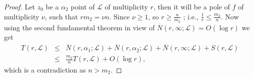 \documentclass[a4paper,draft]{amsproc}
\theoremstyle{plain}
\theoremstyle{definition}
\theoremstyle{remark}
\newcommand{\ol}{\overline}
\newcommand{\beas}{\begin{eqnarray*}}
\newcommand{\eeas}{\end{eqnarray*}}
\numberwithin{equation}{section}
\renewcommand{\leq}{\leqslant}\renewcommand{\geq}{\geqslant}
\begin{document}
\begin{proof}
Let $z_0$ be a $\alpha_2$ point of $\mathcal{L}$ of multiplicity $r$, then it will be a pole of $f$ of multiplicity $\nu$, such that $rm_2=\nu n$. Since $\nu \geq 1$, so $r \geq \frac{n}{m_2}$ ; i.e., $\frac{1}{r} \leq\frac{m_2}{n}.$ Now using the second fundamental theorem  in view of $\ol{N}(r,\infty;\mathcal{L})=O(\log r)$ we get
\beas T(r,\mathcal{L}) &\leq& \ol N(r,\alpha_{1};\mathcal{L})+\ol N(r,\alpha_{2};\mathcal{L})+\ol  N(r,\infty;\mathcal{L})+S(r,\mathcal{L})\\&\leq& \frac{m_2}{n} T(r,\mathcal{L})+O(\log r),\eeas
which is a contradiction as $n>m_2$. 	
\end{proof}
\end{document}
